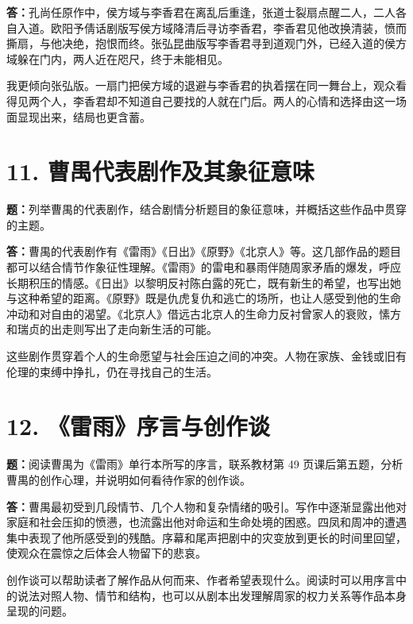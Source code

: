 \documentclass[11pt,a4paper,fontset=windows]{ctexart}
\newenvironment{answer}{\par\begingroup\answerlatin\answercjk}{\par\endgroup}
\begin{document}
\begin{answer}
\textbf{答：}孔尚任原作中，侯方域与李香君在离乱后重逢，张道士裂扇点醒二人，二人各自入道。欧阳予倩话剧版写侯方域降清后寻访李香君，李香君见他改换清装，愤而撕扇，与他决绝，抱恨而终。张弘昆曲版写李香君寻到道观门外，已经入道的侯方域躲在门内，两人近在咫尺，终于未能相见。

我更倾向张弘版。一扇门把侯方域的退避与李香君的执着摆在同一舞台上，观众看得见两个人，李香君却不知道自己要找的人就在门后。两人的心情和选择由这一场面显现出来，结局也更含蓄。

\end{answer}
\section*{11. 曹禺代表剧作及其象征意味}

\textbf{题：}列举曹禺的代表剧作，结合剧情分析题目的象征意味，并概括这些作品中贯穿的主题。

\begin{answer}
\textbf{答：}曹禺的代表剧作有《雷雨》《日出》《原野》《北京人》等。这几部作品的题目都可以结合情节作象征性理解。《雷雨》的雷电和暴雨伴随周家矛盾的爆发，呼应长期积压的情感。《日出》以黎明反衬陈白露的死亡，既有新生的希望，也写出她与这种希望的距离。《原野》既是仇虎复仇和逃亡的场所，也让人感受到他的生命冲动和对自由的渴望。《北京人》借远古北京人的生命力反衬曾家人的衰败，愫方和瑞贞的出走则写出了走向新生活的可能。

这些剧作贯穿着个人的生命愿望与社会压迫之间的冲突。人物在家族、金钱或旧有伦理的束缚中挣扎，仍在寻找自己的生活。

\end{answer}
\section*{12. 《雷雨》序言与创作谈}

\textbf{题：}阅读曹禺为《雷雨》单行本所写的序言，联系教材第 49 页课后第五题，分析曹禺的创作心理，并说明如何看待作家的创作谈。

\begin{answer}
\textbf{答：}曹禺最初受到几段情节、几个人物和复杂情绪的吸引。写作中逐渐显露出他对家庭和社会压抑的愤懑，也流露出他对命运和生命处境的困惑。四凤和周冲的遭遇集中表现了他所感受到的残酷。序幕和尾声把剧中的灾变放到更长的时间里回望，使观众在震惊之后体会人物留下的悲哀。

创作谈可以帮助读者了解作品从何而来、作者希望表现什么。阅读时可以用序言中的说法对照人物、情节和结构，也可以从剧本出发理解周家的权力关系等作品本身呈现的问题。

\end{answer}
\end{document}
